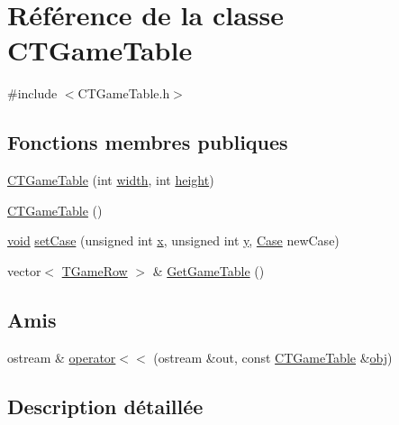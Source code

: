 \hypertarget{class_c_t_game_table}{\section{Référence de la classe C\-T\-Game\-Table}
\label{class_c_t_game_table}
}


{\ttfamily \#include $<$C\-T\-Game\-Table.\-h$>$}

\subsection*{Fonctions membres publiques}
\begin{DoxyCompactItemize}
\item 
\hyperlink{class_c_t_game_table_a432c463fb469454b0923c3ab868650cc}{C\-T\-Game\-Table} (int \hyperlink{gl_8h_a30a197eaed803ac3cd1b444d4c972354}{width}, int \hyperlink{gl_8h_aab021b2df174b06135ca6744356dcf34}{height})
\item 
\hyperlink{class_c_t_game_table_a4a52b184a392cb914cd9fd92234be744}{C\-T\-Game\-Table} ()
\item 
\hyperlink{glu_8h_a4292190e3f1f6b373a760c7d9316ad3c}{void} \hyperlink{class_c_t_game_table_a93e226e7dfc8ea98582bcbc861504d85}{set\-Case} (unsigned int \hyperlink{gl_8h_a0cdec8e97a75ee9458b23d152bf962d4}{x}, unsigned int \hyperlink{gl_8h_a74d80fd479c0f6d0153c709949a089ef}{y}, \hyperlink{struct_case}{Case} new\-Case)
\item 
vector$<$ \hyperlink{_c_t_game_table_8h_a2170512a04991cf2b86082f2ca5992a6}{T\-Game\-Row} $>$ \& \hyperlink{class_c_t_game_table_a1ae234b52213c9ffad0dc129a5279719}{Get\-Game\-Table} ()
\end{DoxyCompactItemize}
\subsection*{Amis}
\begin{DoxyCompactItemize}
\item 
ostream \& \hyperlink{class_c_t_game_table_a51fe5bffaa61c49ca73f2a4326c275f0}{operator$<$$<$} (ostream \&out, const \hyperlink{class_c_t_game_table}{C\-T\-Game\-Table} \&\hyperlink{glext_8h_a0c0d4701a6c89f4f7f0640715d27ab26}{obj})
\end{DoxyCompactItemize}


\subsection{Description détaillée}


